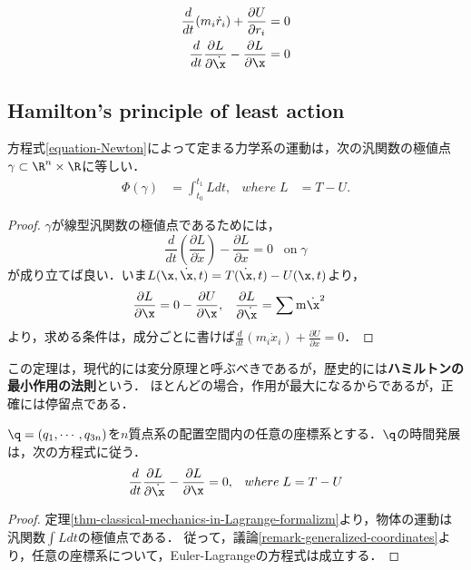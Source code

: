 \documentclass[uplatex, 12pt, dvipdfmx]{jsreport}
\begin{document}
\begin{align}
    \frac{d}{dt}(m_i\dot{r}_i)+\frac{\partial U}{\partial r_i}=0 \label{equation-Newton}\\
    \frac{d}{dt}\frac{\partial L}{\partial\dot{\x}}-\frac{\partial L}{\partial\x}=0 \label{equation-Lagrange}
\end{align}

\subsection{Hamilton's principle of least action}

\begin{theorem}\label{thm-classical-mechanics-in-Lagrange-formalizm}
    方程式\ref{equation-Newton}によって定まる力学系の運動は，次の汎関数の極値点$\gamma\subset\R^n\times\R$に等しい．
    \begin{align*}
        \Phi(\gamma)&=\int^{t_1}_{t_0}Ldt,&where\;L&=T-U.
    \end{align*}
\end{theorem}
\begin{proof}
    $\gamma$が線型汎関数の極値点であるためには，
    \[ \frac{d}{dt}\left(\frac{\partial L}{\partial\dot{x}}\right) - \frac{\partial L}{\partial x} = 0\;\;\;\mathrm{on\;}\gamma \]
    が成り立てば良い．いま$L(\x,\dot{\x},t)=T(\dot{\x},t)-U(\x,t)$より，
    \begin{align*}
        \frac{\partial L}{\partial\x}&=0-\frac{\partial U}{\partial\x},&\frac{\partial L}{\partial\dot{\x}}&=\sum \mathrm{m}\dot{\x}^2
    \end{align*}
    より，求める条件は，成分ごとに書けば$\frac{d}{dt}(m_i\dot{x}_i)+\frac{\partial U}{\partial x}=0$．
\end{proof}
\begin{remark}
    この定理は，現代的には変分原理と呼ぶべきであるが，歴史的には\textbf{ハミルトンの最小作用の法則}という．
    ほとんどの場合，作用が最大になるからであるが，正確には停留点である．
\end{remark}

\begin{corollary}
    $\q=(q_1,\cdots,q_{3n})$を$n$質点系の配置空間内の任意の座標系とする．$\q$の時間発展は，次の方程式に従う．
    \begin{align*}
        \frac{d}{dt}\frac{\partial L}{\partial\dot{\x}}-\frac{\partial L}{\partial\x}&=0,&where\;L=T-U
    \end{align*}
\end{corollary}
\begin{proof}
    定理\ref{thm-classical-mechanics-in-Lagrange-formalizm}より，物体の運動は汎関数$\int Ldt$の極値点である．
    従って，議論\ref{remark-generalized-coordinates}より，任意の座標系について，Euler-Lagrangeの方程式は成立する．
\end{proof}
\end{document}
